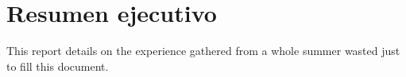 %


\section*{Resumen ejecutivo}
This report details on the experience gathered from a whole summer wasted just to fill this document.
